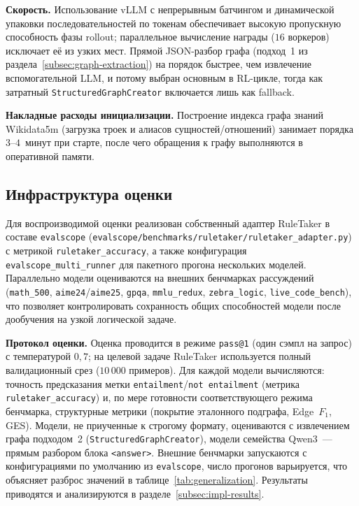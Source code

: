 \textbf{Скорость.} Использование vLLM с непрерывным батчингом и динамической упаковки последовательностей по токенам обеспечивает высокую пропускную способность фазы rollout; параллельное вычисление награды ($16$ воркеров) исключает её из узких мест. Прямой JSON-разбор графа (подход~1 из раздела~\ref{subsec:graph-extraction}) на порядок быстрее, чем извлечение вспомогательной LLM, и потому выбран основным в RL-цикле, тогда как затратный \texttt{StructuredGraphCreator} включается лишь как fallback.

\textbf{Накладные расходы инициализации.} Построение индекса графа знаний Wikidata5m (загрузка троек и алиасов сущностей/отношений) занимает порядка $3$--$4$~минут при старте, после чего обращения к графу выполняются в оперативной памяти.

\subsection{Инфраструктура оценки}
\label{subsec:impl-eval}

Для воспроизводимой оценки реализован собственный адаптер RuleTaker в составе \texttt{evalscope} (\texttt{evalscope/benchmarks/ruletaker/ruletaker\_adapter.py}) с метрикой \texttt{rule\-taker\_accuracy}, а также конфигурация \texttt{evalscope\_multi\_runner} для пакетного прогона нескольких моделей. Параллельно модели оцениваются на внешних бенчмарках рассуждений (\texttt{math\_500}, \texttt{aime24}/\texttt{aime25}, \texttt{gpqa}, \texttt{mmlu\_redux}, \texttt{zebra\_logic}, \texttt{live\_code\_bench}), что позволяет контролировать сохранность общих способностей модели после дообучения на узкой логической задаче.

\textbf{Протокол оценки.} Оценка проводится в режиме \texttt{pass@1} (один сэмпл на запрос) с температурой $0{,}7$; на целевой задаче RuleTaker используется полный валидационный срез ($10\,000$ примеров). Для каждой модели вычисляются: точность предсказания метки \texttt{entailment}/\texttt{not entailment} (метрика \texttt{ruletaker\_accuracy}) и, по мере готовности соответствующего режима бенчмарка, структурные метрики (покрытие эталонного подграфа, Edge~$F_1$, GES). Модели, не приученные к строгому формату, оцениваются с извлечением графа подходом~2 (\texttt{StructuredGraphCreator}), модели семейства Qwen3~--- прямым разбором блока \texttt{<answer>}. Внешние бенчмарки запускаются с конфигурациями по умолчанию из \texttt{evalscope}, число прогонов варьируется, что объясняет разброс значений в таблице~\ref{tab:generalization}. Результаты приводятся и анализируются в разделе~\ref{subsec:impl-results}.

